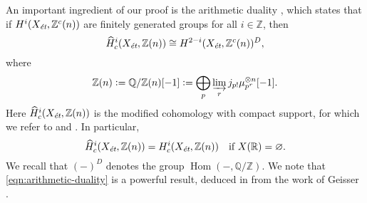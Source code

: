 \documentclass[draft]{article}
\DeclareMathOperator{\Hom}{Hom}
\newcommand{\QQ}{\mathbb{Q}}
\newcommand{\RR}{\mathbb{R}}
\newcommand{\ZZ}{\mathbb{Z}}
\renewcommand{\emptyset}{\varnothing}
\newcommand{\et}{\text{\it \'{e}t}}
\newcommand{\dfn}{\mathrel{\mathop:}=}
\theoremstyle{myplain}
\theoremstyle{mydefinition}
\begin{document}
An important ingredient of our proof is the arithmetic duality
\cite[Theorem~I]{Beshenov-Weil-etale-1}, which states that if
$H^i (X_\et, \ZZ^c (n))$ are finitely generated groups for all $i \in \ZZ$, then
\begin{equation}
  \label{eqn:arithmetic-duality}
  \widehat{H}^i_c (X_\et, \ZZ (n)) \cong
  H^{2-i} (X_\et, \ZZ^c (n))^D,
\end{equation}
where
\begin{equation}
  \label{eqn:definition-of-Z(n)}
  \ZZ (n) \dfn \QQ/\ZZ (n) [-1] \dfn
  \bigoplus_p \varinjlim_r j_{p!} \mu_{p^r}^{\otimes n} [-1].
\end{equation}
Here $\widehat{H}^i_c (X_\et, \ZZ (n))$ is the modified cohomology with compact
support, for which we refer to \cite[\S 2]{Geisser-Schmidt-2018} and
\cite[Appendix~B]{Beshenov-Weil-etale-1}. In particular,
\[
  \widehat{H}^i_c (X_\et, \ZZ (n)) = H^i_c (X_\et, \ZZ (n))
  \quad
  \text{if }X (\RR) = \emptyset.
\]
We recall that $(-)^D$ denotes the group $\Hom (-, \QQ/\ZZ)$. We note that
\eqref{eqn:arithmetic-duality} is a powerful result, deduced in
\cite{Beshenov-Weil-etale-1} from the work of Geisser \cite{Geisser-2010}.
\end{document}
